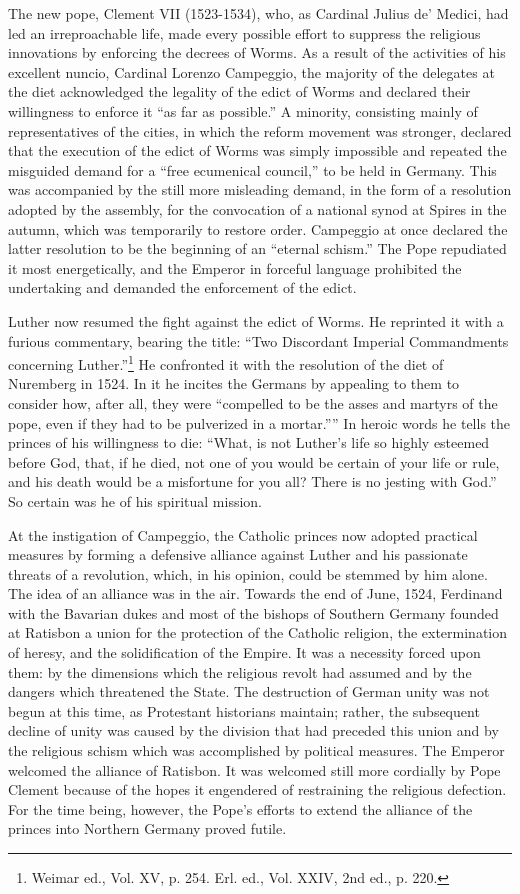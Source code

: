 The new pope, Clement VII (1523-1534), who, as Cardinal Julius
de’ Medici, had led an irreproachable life, made every possible effort
to suppress the religious innovations by enforcing the decrees of
Worms. As a result of the activities of his excellent nuncio, Cardinal
Lorenzo Campeggio, the majority of the delegates at the diet
acknowledged the legality of the edict of Worms and declared their
willingness to enforce it “as far as possible.” A minority, consisting
mainly of representatives of the cities, in which the reform movement
was stronger, declared that the execution of the edict of
Worms was simply impossible and repeated the misguided demand
for a “free ecumenical council,” to be held in Germany. This was
accompanied by the still more misleading demand, in the form of a
resolution adopted by the assembly, for the convocation of a national
synod at Spires in the autumn, which was temporarily to restore
order. Campeggio at once declared the latter resolution to be the
beginning of an “eternal schism.” The Pope repudiated it most
energetically, and the Emperor in forceful language prohibited the
undertaking and demanded the enforcement of the edict.

Luther now resumed the fight against the edict of Worms. He
reprinted it with a furious commentary, bearing the title: “Two
Discordant Imperial Commandments concerning Luther.”\footnote
{Weimar ed., Vol. XV, p. 254. Erl. ed., Vol. XXIV, 2nd ed., p. 220.}
He confronted it with the resolution of the diet of Nuremberg in 1524. In
it he incites the Germans by appealing to them to consider how, after
all, they were “compelled to be the asses and martyrs of the pope,
even if they had to be pulverized in a mortar.”” In heroic words he
tells the princes of his willingness to die: “What, is not Luther’s
life so highly esteemed before God, that, if he died, not one of you
would be certain of your life or rule, and his death would be a
misfortune for you all? There is no jesting with God.” So certain
was he of his spiritual mission.

At the instigation of Campeggio, the Catholic princes now adopted
practical measures by forming a defensive alliance against Luther
and his passionate threats of a revolution, which, in his opinion, could
be stemmed by him alone. The idea of an alliance was in the air.
Towards the end of June, 1524, Ferdinand with the Bavarian dukes
and most of the bishops of Southern Germany founded at Ratisbon
a union for the protection of the Catholic religion, the extermination
of heresy, and the solidification of the Empire. It was a necessity
forced upon them: by the dimensions which the religious revolt had
assumed and by the dangers which threatened the State. The destruction
of German unity was not begun at this time, as Protestant historians
maintain; rather, the subsequent decline of unity was caused
by the division that had preceded this union and by the religious
schism which was accomplished by political measures. The Emperor
welcomed the alliance of Ratisbon. It was welcomed still more cordially
by Pope Clement because of the hopes it engendered of restraining the religious
defection. For the time being, however, the Pope’s
efforts to extend the alliance of the princes into Northern Germany
proved futile.

